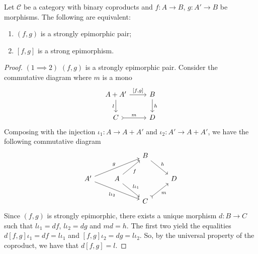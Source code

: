 \begin{mainbox}{}
    \begin{prop}\label{Equivalence strong epi with coprod}
    Let $\mathcal{C}$ be a category with binary coproducts and $f : A \to B$, $g : A' \to B$ be morphisms. The following are equivalent:
    \begin{enumerate}
        \item $(f,g)$ is a strongly epimorphic pair;
        \item $[f,g]$ is a strong epimorphism.
    \end{enumerate}
    \end{prop}
\end{mainbox}

\begin{subbox}{}
    \begin{proof}
        $(1 \implies 2)$ $(f,g)$ is a strongly epimorphic pair. Consider the commutative diagram where $m$ is a mono
        \[ 
\begin{tikzcd}
    A+A' \arrow[r, "{[f,g]}"] \arrow[d, "l"'] & B \arrow[d, "h"] \\
    C \arrow[r, "m", tail]                    & D               
    \end{tikzcd}
        \]
        Composing with the injection $\iota_1 : A \to A+A'$ and $\iota_2 : A' \to A+A'$, we have the following commutative diagram
        \[
\begin{tikzcd}
    &                                           & B \arrow[rd, "h"]        &   \\
A' \arrow[rru, "g"] \arrow[rrd, "l\iota_2"'] & A \arrow[ru, "f"'] \arrow[rd, "l\iota_1"] &                          & D \\
    &                                           & C \arrow[ru, "m"', tail] &  
\end{tikzcd}
    \]
    Since $(f,g)$ is strongly epimorphic, there exists a unique morphism $d: B \to C$ such that $l\iota_1=df$, $l\iota_2=dg$ and $md=h$. The first two yield the equalities $d[f,g]\iota_1=df=l\iota_1$ and $[f,g]\iota_2=dg=l\iota_2$. So, by the universal property of the coproduct, we have that $d[f,g]=l$.

\end{proof}
\end{subbox}
